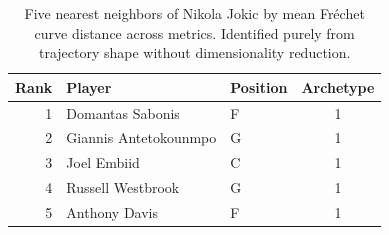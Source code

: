 \begin{table}[htbp]
  \centering\small
  \begin{tabular}{rllc}
    \toprule
    Rank & Player & Position & Archetype \\
    \midrule
    1 & Domantas Sabonis & F & 1 \\
    2 & Giannis Antetokounmpo & G & 1 \\
    3 & Joel Embiid & C & 1 \\
    4 & Russell Westbrook & G & 1 \\
    5 & Anthony Davis & F & 1 \\
    \bottomrule
  \end{tabular}
  \caption{Five nearest neighbors of Nikola Jokic by mean Fr\'{e}chet curve distance across metrics. Identified purely from trajectory shape without dimensionality reduction.}
  \label{tab:Nikola_Jokic_frechet_curve_neighbors}
\end{table}

